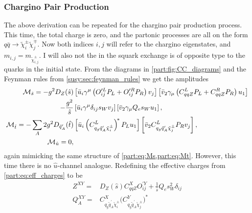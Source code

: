 \documentclass[../main.tex]{subfiles}
\begin{document}
\subsubsection*{Chargino Pair Production}
The above derivation can be repeated for the chargino pair production process.
This time, the total charge is zero, and the partonic processes are all on the form \(q\bar{q} \to \tilde\chi^\pm_i \tilde\chi^\mp_j\).
Now both indices \(i, j\) will refer to the chargino eigenstates, and \(m_{i,j} = m_{\tilde\chi^\pm_{i,j}}\).
I will also not the in the squark exchange is of opposite type to the quarks in the initial state.
From the diagrams in \cref{part:fig:CC_diagrams} and the Feynman rules from \cref{susy:sec:feynman_rules} we get the amplitudes
\begin{subequations}
  \begin{align}
    \nonumber
    \mathcal{M}_{\hat{s}} = -g^2 D_Z(\hat{s})                            & \left[ \bar{u}_i\gamma^\mu\left(O^{\prime L}_{ij}P_L + O^{\prime R}_{ij}P_R\right) v_j \right] \left[ \bar{v}_2 \gamma_\mu \left(C^L_{qqZ}P_L + C^R_{qqZ}P_R\right) u_1 \right]
    \\
    \label{part:eq:CC_Ms}
    -\frac{g^2}{\hat{s}}                                        & \left[ \bar{u}_i\gamma^\mu \delta_{ij} s_W v_j \right] \left[ \bar{v}_2 \gamma_\mu Q_e s_W u_1 \right],                                                                          \\
    \label{part:eq:CC_Mt}
    \mathcal{M}_{\hat{t}} = -\sum_A 2g^2 D_{\tilde{q}^\prime_A}(\hat{t}) & \left[ \bar{u}_i \left(C_{q_g \tilde{q}_A^\prime \tilde\chi^\pm_i}^L\right)^{\!\ast} P_L u_1 \right] \left[ \bar{v}_2 C_{q_g \tilde{q}_A^\prime \tilde\chi^\pm_j}^L P_R v_j\right], \\
    \label{part:eq:CC_Mu}
    \mathcal{M}_{\hat{u}} = 0,                                           &
  \end{align}
\end{subequations}
again mimicking the same structure of \cref{part:eq:Ms,part:eq:Mt}.
However, this time there is no \(\hat{u}\)-channel analogue.
Redefining the effective charges from \cref{part:eq:eff_charges} to be
\begin{subequations}
  \begin{align*}
    Z^{XY} =   & D_Z(\hat{s}) C_{qqZ}^X O_{ij}^{\prime Y} + \frac{1}{\hat{s}} Q_e s_W^2 \delta_{ij}                               \\
    Q_A^{XY} = & C_{q_g \tilde{q}_A^\prime \tilde\chi^\pm_i}^X \bigl(C_{q_g \tilde{q}_A^\prime \tilde\chi^\pm_j}^Y\bigr)^{\!\ast}
  \end{align*}
\end{subequations}
\end{document}

